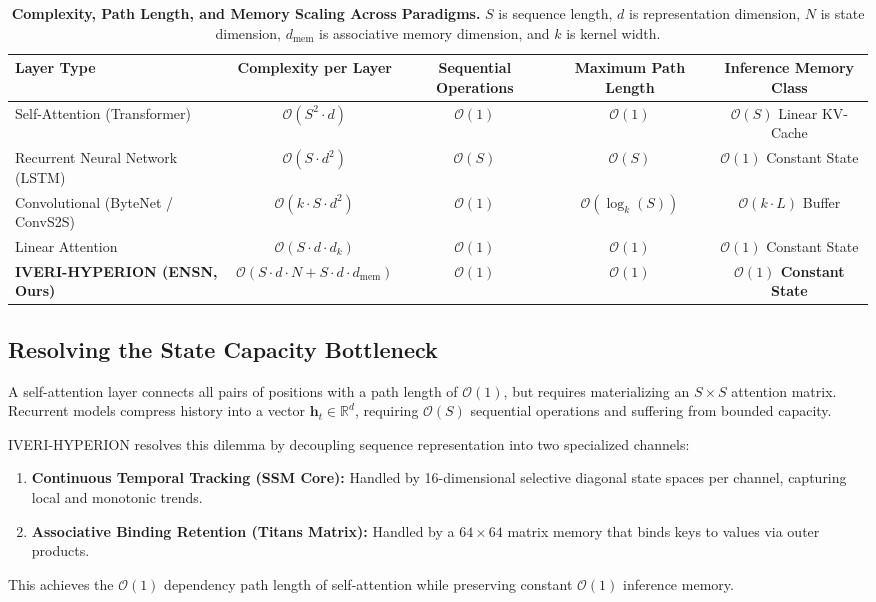\documentclass[10pt,twocolumn,letterpaper]{article}
\begin{document}
\begin{table}[t]
\centering
\small
\caption{\textbf{Complexity, Path Length, and Memory Scaling Across Paradigms.} $S$ is sequence length, $d$ is representation dimension, $N$ is state dimension, $d_{\text{mem}}$ is associative memory dimension, and $k$ is kernel width.}
\label{tab:complexity}
\begin{tabular}{lcccc}
\toprule
\textbf{Layer Type} & \textbf{Complexity per Layer} & \textbf{Sequential Operations} & \textbf{Maximum Path Length} & \textbf{Inference Memory Class} \\
\midrule
Self-Attention (Transformer)~\cite{vaswani2017attention} & $\mathcal{O}(S^2 \cdot d)$ & $\mathcal{O}(1)$ & $\mathcal{O}(1)$ & $\mathcal{O}(S)$ Linear KV-Cache \\
Recurrent Neural Network (LSTM)~\cite{hochreiter1997lstm} & $\mathcal{O}(S \cdot d^2)$ & $\mathcal{O}(S)$ & $\mathcal{O}(S)$ & $\mathcal{O}(1)$ Constant State \\
Convolutional (ByteNet / ConvS2S)~\cite{kalchbrenner2016bytenet} & $\mathcal{O}(k \cdot S \cdot d^2)$ & $\mathcal{O}(1)$ & $\mathcal{O}(\log_k(S))$ & $\mathcal{O}(k \cdot L)$ Buffer \\
Linear Attention~\cite{katharopoulos2020transformers} & $\mathcal{O}(S \cdot d \cdot d_k)$ & $\mathcal{O}(1)$ & $\mathcal{O}(1)$ & $\mathcal{O}(1)$ Constant State \\
\textbf{IVERI-HYPERION (ENSN, Ours)} & \textbf{$\mathcal{O}(S \cdot d \cdot N + S \cdot d \cdot d_{\text{mem}})$} & \textbf{$\mathcal{O}(1)$} & \textbf{$\mathcal{O}(1)$} & \textbf{$\mathcal{O}(1)$ Constant State} \\
\bottomrule
\end{tabular}
\end{table}

\subsection{Resolving the State Capacity Bottleneck}
A self-attention layer connects all pairs of positions with a path length of $\mathcal{O}(1)$, but requires materializing an $S \times S$ attention matrix. Recurrent models compress history into a vector $\mathbf{h}_t \in \mathbb{R}^d$, requiring $\mathcal{O}(S)$ sequential operations and suffering from bounded capacity.

IVERI-HYPERION resolves this dilemma by decoupling sequence representation into two specialized channels:
\begin{enumerate}[leftmargin=*]
    \item \textbf{Continuous Temporal Tracking (SSM Core):} Handled by 16-dimensional selective diagonal state spaces per channel, capturing local and monotonic trends.
    \item \textbf{Associative Binding Retention (Titans Matrix):} Handled by a $64 \times 64$ matrix memory that binds keys to values via outer products.
\end{enumerate}
This achieves the $\mathcal{O}(1)$ dependency path length of self-attention while preserving constant $\mathcal{O}(1)$ inference memory.
\end{document}
